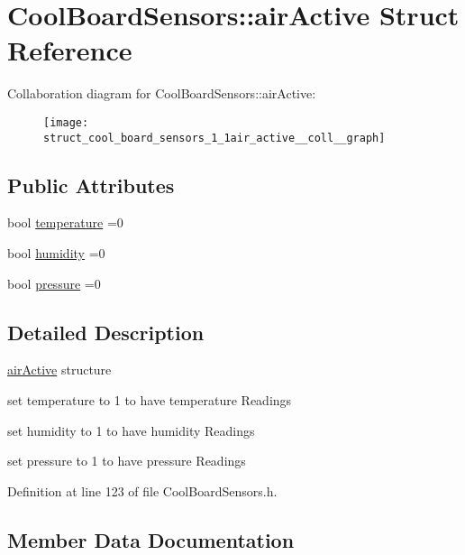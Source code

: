 \hypertarget{struct_cool_board_sensors_1_1air_active}{}\section{Cool\+Board\+Sensors\+:\+:air\+Active Struct Reference}
\label{struct_cool_board_sensors_1_1air_active}


Collaboration diagram for Cool\+Board\+Sensors\+:\+:air\+Active\+:\nopagebreak
\begin{figure}[H]
\begin{center}
\leavevmode
\texttt{[image: struct\_cool\_board\_sensors\_1\_1air\_active\_\_coll\_\_graph]}
\end{center}
\end{figure}
\subsection*{Public Attributes}
\begin{DoxyCompactItemize}
\item 
bool \hyperlink{struct_cool_board_sensors_1_1air_active_ac08576736c7ac3bfbfec32e5ee17c686}{temperature} =0
\item 
bool \hyperlink{struct_cool_board_sensors_1_1air_active_ab69738e9fd1c2ba80dc666bcd1e116f7}{humidity} =0
\item 
bool \hyperlink{struct_cool_board_sensors_1_1air_active_a15932ccfb6ee6603713d937ec9b76b72}{pressure} =0
\end{DoxyCompactItemize}


\subsection{Detailed Description}
\hyperlink{struct_cool_board_sensors_1_1air_active}{air\+Active} structure

set temperature to 1 to have temperature Readings

set humidity to 1 to have humidity Readings

set pressure to 1 to have pressure Readings 

Definition at line 123 of file Cool\+Board\+Sensors.\+h.



\subsection{Member Data Documentation}
\mbox{\label{struct_cool_board_sensors_1_1air_active_ab69738e9fd1c2ba80dc666bcd1e116f7}} 
